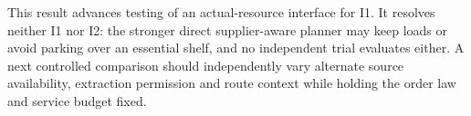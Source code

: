 \documentclass{article}
\begin{document}
This result advances testing of an actual-resource interface for I1. It resolves neither I1 nor I2: the stronger direct supplier-aware planner may keep loads or avoid parking over an essential shelf, and no independent trial evaluates either. A next controlled comparison should independently vary alternate source availability, extraction permission and route context while holding the order law and service budget fixed.
\end{document}

